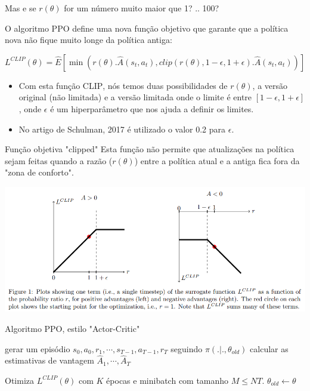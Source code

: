 \documentclass{beamer}
\begin{document}
\begin{frame}{Mas e se $r(\theta)$ for um número muito maior que 1? .. 100?}
	
O algoritmo PPO define uma nova função objetivo que garante que a política nova não fique muito longe da política antiga:
	
	\begin{equation}
	L^{CLIP}(\theta) = \hat{E} \left[ \min \left(r(\theta).\hat{A}(s_{t},a_{t}) , clip(r(\theta), 1 - \epsilon, 1 + \epsilon).\hat{A}(s_{t},a_{t}) \right) \right]		
	\end{equation}

\begin{itemize}
	\item Com esta função \textsc{CLIP}, nós temos duas possibilidades de $r(\theta)$, a versão original (não limitada) e a versão limitada onde o limite é entre $\left[ 1 - \epsilon, 1 + \epsilon \right]$, onde $\epsilon$ é um hiperparâmetro que nos ajuda a definir os limites. 
	\item No artigo de Schulman, 2017 é utilizado o valor 0.2 para $\epsilon$.
\end{itemize}
	
\end{frame}


\begin{frame}{Função objetiva "clipped"}
	Esta função não permite que atualizações na política sejam feitas quando a razão ($r(\theta)$) entre a política atual e a antiga fica fora da "zona de conforto". 
	\begin{center}
		\includegraphics[width=1\textwidth]{img/clip.png}
	\end{center}
\end{frame}

\begin{frame}{Algoritmo PPO, estilo "Actor-Critic"}

\begin{algorithmic} 
			\STATE gerar um episódio ${s_{0},a_{0},r_{1},\cdots,s_{T-1},a_{T-1},r_{T}}$ seguindo $\pi(.|.,\theta_{old})$
			\STATE calcular as estimativas de vantagem $\hat{A}_{1}, \cdots, \hat{A}_{T}$
		\ENDFOR
	
	\STATE Otimiza $L^{CLIP}(\theta)$ com $K$ épocas e minibatch com tamanho $M \leq NT$. 
	\STATE $\theta_{old} \leftarrow \theta$
	
	\ENDFOR
\end{algorithmic}	
	
\end{frame}
\end{document}
